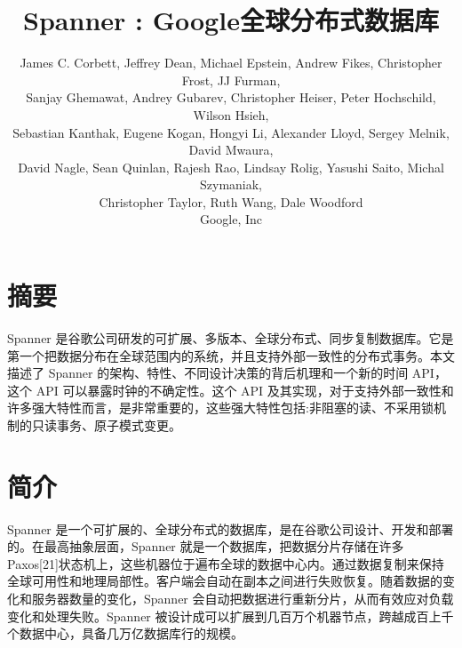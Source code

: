 \documentclass[letterpaper,twocolumn,10pt]{article}
\begin{document}
\date{}

\title{\Large \bf Spanner : Google全球分布式数据库}
\author{
{\rm James C. Corbett, Jeffrey Dean, Michael Epstein, Andrew Fikes, Christopher Frost, JJ Furman,}\\
{Sanjay Ghemawat, Andrey Gubarev, Christopher Heiser, Peter Hochschild, Wilson Hsieh, }\\
{Sebastian Kanthak, Eugene Kogan, Hongyi Li, Alexander Lloyd, Sergey Melnik, David Mwaura,}\\
{ David Nagle, Sean Quinlan, Rajesh Rao, Lindsay Rolig, Yasushi Saito, Michal Szymaniak, }\\
{Christopher Taylor, Ruth Wang, Dale Woodford}\\ 
Google, Inc 
}

\maketitle

\thispagestyle{fancy}
\renewcommand{\headrulewidth}{0pt}

\section*{摘要}
Spanner 是谷歌公司研发的可扩展、多版本、全球分布式、同步复制数据库。它是第一个把数据分布在全球范围内的系统，并且支持外部一致性的分布式事务。本文描述了 Spanner 的架构、特性、不同设计决策的背后机理和一个新的时间 API，这个 API 可以暴露时钟的不确定性。这个 API 及其实现，对于支持外部一致性和许多强大特性而言，是非常重要的，这些强大特性包括:非阻塞的读、不采用锁机制的只读事务、原子模式变更。

\section{简介}
Spanner 是一个可扩展的、全球分布式的数据库，是在谷歌公司设计、开发和部署的。在最高抽象层面，Spanner 就是一个数据库，把数据分片存储在许多 Paxos[21]状态机上，这些机器位于遍布全球的数据中心内。通过数据复制来保持全球可用性和地理局部性。客户端会自动在副本之间进行失败恢复。随着数据的变化和服务器数量的变化，Spanner 会自动把数据进行重新分片，从而有效应对负载变化和处理失败。Spanner 被设计成可以扩展到几百万个机器节点，跨越成百上千个数据中心，具备几万亿数据库行的规模。
\end{document}
